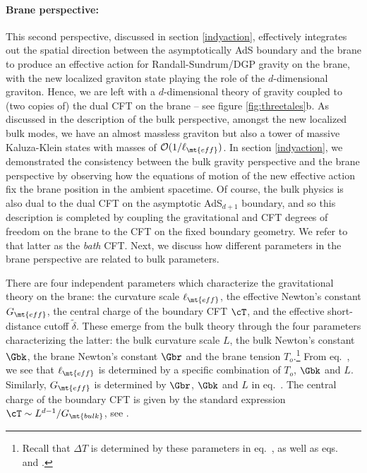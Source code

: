 \paragraph{Brane perspective:} This second perspective, discussed in section \ref{indyaction}, effectively integrates out the spatial direction between the asymptotically AdS boundary and the brane to produce an effective action  for Randall-Sundrum/DGP gravity on the brane, with the new localized graviton state playing the role of the $d$-dimensional graviton. Hence, we are left with a $d$-dimensional theory of gravity coupled to (two copies of) the dual CFT on the brane -- see figure \ref{fig:threetales}b. As discussed in the description of the bulk perspective, amongst the new localized bulk modes, we have an almost massless graviton but also a tower of massive Kaluza-Klein states with masses of ${\cal O}(1/\ell_\mt{eff})$.  In section \ref{indyaction}, we demonstrated the consistency between the bulk gravity perspective and the brane perspective by observing how the equations of motion of the new effective action fix the brane position in the ambient spacetime. Of course, the bulk physics is also dual to the dual CFT on the asymptotic AdS$_{d+1}$ boundary, and so this description is completed by coupling the gravitational and CFT degrees of freedom on the brane to the  CFT on the fixed boundary geometry. We refer to that latter as the {\it bath} CFT. Next, we discuss how different parameters in the brane perspective are related to bulk parameters. 

There are four independent parameters which characterize the gravitational theory on the brane: the curvature scale $\ell_\mt{eff}$, the effective Newton's constant $G_\mt{eff}$, the central charge of the boundary CFT $\cT$, and the effective short-distance cutoff $\tilde\delta$. These emerge from the bulk theory through the four parameters characterizing the latter: the bulk curvature scale $L$, the bulk Newton's constant $\Gbk$, the brane Newton's constant $\Gbr$ and the brane tension $T_o$.\footnote{Recall that $\Delta T$ is determined by these parameters in eq.~, as well as eqs.~ and .} From eq.~, we see that $\ell_\mt{eff}$ is determined by a specific combination of $T_o$, $\Gbk$ and $L$. Similarly, $G_\mt{eff}$ is determined by $\Gbr$, $\Gbk$ and $L$ in eq.~. The central charge of the boundary CFT is given by the standard expression $\cT\sim L^{d-1}/G_\mt{bulk}$, \eg see \cite{Buchel:2009sk}. 

